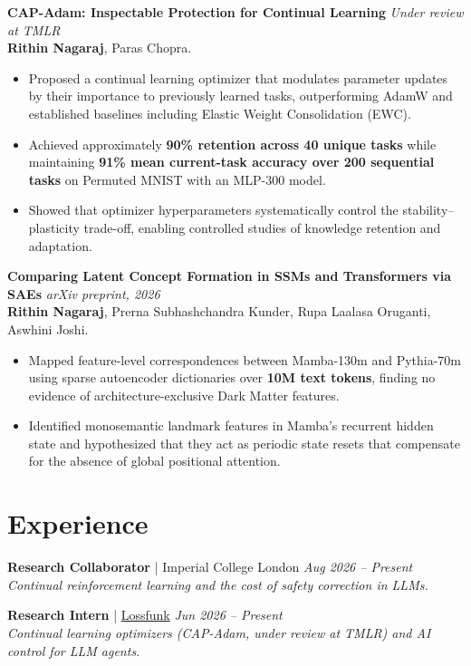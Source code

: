\documentclass[10pt,a4paper]{article}
\newcommand{\entrygap}{\vspace{5pt}\needspace{4\baselineskip}}
\begin{document}
\textbf{CAP-Adam: Inspectable Protection for Continual Learning}
\hfill \textit{Under review at TMLR} \\
\textbf{Rithin Nagaraj}, Paras Chopra.
\begin{itemize}
  \item Proposed a continual learning optimizer that modulates parameter updates by their importance to previously learned tasks, outperforming AdamW and established baselines including Elastic Weight Consolidation (EWC).
  \item Achieved approximately \textbf{90\% retention across 40 unique tasks} while maintaining \textbf{91\% mean current-task accuracy over 200 sequential tasks} on Permuted MNIST with an MLP-300 model.
  \item Showed that optimizer hyperparameters systematically control the stability--plasticity trade-off, enabling controlled studies of knowledge retention and adaptation.
\end{itemize}
\entrygap

\textbf{Comparing Latent Concept Formation in SSMs and Transformers via SAEs}
\hfill \textit{arXiv preprint, 2026} \\
\textbf{Rithin Nagaraj}, Prerna Subhashchandra Kunder, Rupa Laalasa Oruganti, Aswhini Joshi.
\begin{itemize}
  \item Mapped feature-level correspondences between Mamba-130m and Pythia-70m using sparse autoencoder dictionaries over \textbf{10M text tokens}, finding no evidence of architecture-exclusive Dark Matter features.
  \item Identified monosemantic landmark features in Mamba's recurrent hidden state and hypothesized that they act as periodic state resets that compensate for the absence of global positional attention.
\end{itemize}

\section{Experience}

\textbf{Research Collaborator} | Imperial College London \hfill \textit{Aug 2026 -- Present} \\
\textit{Continual reinforcement learning and the cost of safety correction in LLMs.}
\entrygap

\textbf{Research Intern} | \href{https://lossfunk.com}{Lossfunk} \hfill \textit{Jun 2026 -- Present} \\
\textit{Continual learning optimizers (CAP-Adam, under review at TMLR) and AI control for LLM agents.}
\entrygap
\end{document}

